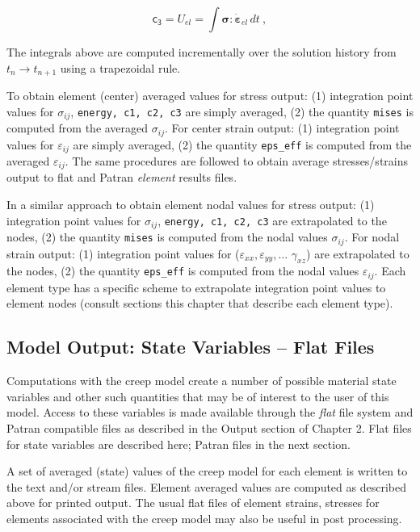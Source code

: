 \documentclass[11pt]{report}
\numberwithin{equation}{section}
\newcommand{\ttt} {\texttt}  %
\newcommand{\hv} {\mathsf}   %
\newcommand{\ti}{\emph}
\newcommand{\veps}{\varepsilon}
\newcommand{\noi}{\noindent}
\begin{document}
\begin{equation} \label{eq:work-output}
      \hv{c_3} =U_{el} =\int \bm{\sigma}:  \dot{\bm{\veps}}_{el}\,dt\ ,
\end{equation}

\normalsize

\noi The integrals above are computed incrementally over the solution
history from $t_n \rightarrow t_{n+1}$ using a trapezoidal rule.

To obtain element (center) averaged values for stress output: (1) integration point values for
$\sigma_{ij}$, \ttt{energy, c1, c2, c3} are simply averaged, (2) the quantity \ttt{mises} is
computed from the averaged $\sigma_{ij}$. For center strain output: (1) integration point values for
$\veps_{ij}$ are simply averaged, (2) the quantity \ttt{eps\_eff} is
computed from the averaged $\veps_{ij}$.  The same procedures are followed to obtain
average stresses/strains output to flat and Patran \ti{element} results files.

In a similar approach to obtain element nodal values for stress output: (1) integration point values for
$\sigma_{ij}$, \ttt{energy, c1, c2, c3} are extrapolated to the nodes, (2) the quantity \ttt{mises} is
computed from the nodal values $\sigma_{ij}$. For nodal  strain output: (1) integration point values for
($\veps_{xx}, \veps_{yy}, \dots $ $\gamma_{xz}$)
 are extrapolated to the nodes, (2) the quantity \ttt{eps\_eff} is
computed from the nodal values $\veps_{ij}$. Each element type has a specific scheme
to extrapolate integration point values to element nodes (consult sections this chapter that
describe each element type). 


\subsection{Model Output: State Variables -- Flat Files}
Computations with the creep model create a number of possible material state variables and other
such quantities that may be of interest to the user of this model.
Access to these variables is made available through the \ti{flat} file system and Patran compatible
files as described
in the Output section of Chapter 2. Flat files for state variables are described here;
Patran files in the next section.

A set of averaged (state) values of the creep model for
each element is written to 
the text and/or stream files. Element averaged values are computed as described
above for printed output. The usual flat files of element strains, stresses for elements associated
with the creep model may also be useful in post processing.
\end{document}
